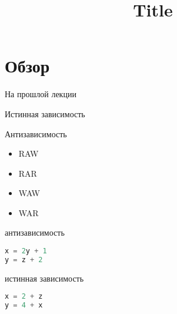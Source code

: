 

\title{Title}



\begin{frame}
\titlepage
\end{frame}

\section{Обзор}

\begin{frame}
\tableofcontents
\end{frame} 

\begin{frame}{На прошлой лекции}
\end{frame}


\begin{frame}

Истинная зависимость

Антизависимость

\end{frame}

\begin{frame}

\begin{itemize}
  \item RAW
  \item RAR
  \item WAW
  \item WAR
\end{itemize}

\end{frame}

\begin{frame}[fragile]

антизависимость

\begin{lstlisting}[language=C,basicstyle=\ttfamily,keywordstyle=\color{blue},basicstyle=\scriptsize]
x = 2y + 1
y = z + 2
\end{lstlisting}

\end{frame}

\begin{frame}[fragile]

истинная зависимость

\begin{lstlisting}[language=C,basicstyle=\ttfamily,keywordstyle=\color{blue},basicstyle=\scriptsize]
x = 2 + z
y = 4 + x
\end{lstlisting}

\end{frame}

